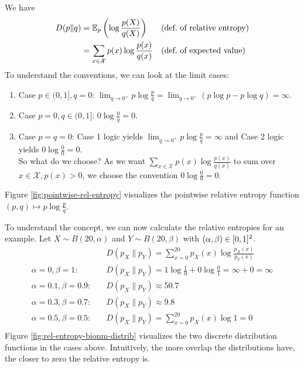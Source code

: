 \begin{remark} \label{remark:relative-entropy-conventions}
    We have
    \begin{align*}
        D(p \| q)   &= \mathbb{E}_{p}\left(\log \frac{p(X)}{q(X)}\right)                      && \text{(def.~of relative entropy)} \\
                    &= \sum_{x \in \mathcal{X}}{p(x) \log \frac{p(x)}{q(x)}}        && \text{(def.~of expected value)}
    \end{align*}
    To understand the conventions, we can look at the limit cases:
    \begin{enumerate}
        \item Case $p \in (0, 1], q = 0$: $\lim_{q \to 0^+} p \log \frac{p}{q} = \lim_{q \to 0^+} (p \log p - p \log q) = \infty$.
        \item Case $p = 0, q \in (0, 1]$: $0 \log \frac{0}{q} = 0$.
        \item Case $p = q = 0$: Case 1 logic yields $\lim_{q \to 0^+} p \log \frac{p}{q} = \infty$ and Case 2 logic yields $0 \log \frac{0}{0} = 0$. \\
            So what do we choose?
            As we want $\sum_{x \in \mathcal{X}}{p(x) \log \frac{p(x)}{q(x)}}$ to sum over $x \in \mathcal{X}, p(x) > 0$, we choose the convention $0 \log \frac{0}{0} = 0$.
    \end{enumerate}
    Figure \ref{fig:pointwise-rel-entropy} visualizes the pointwise relative entropy function $(p, q) \mapsto p \log \frac{p}{q}$.
\end{remark}

\begin{example}
    To understand the concept, we can now calculate the relative entropies for an example.
    Let $X \sim B(20, \alpha)$ and $Y \sim B(20, \beta)$ with $\left(\alpha, \beta\right) \in [0, 1]^2$.
    \begin{align*}
                                 & \quad D(p_X \| p_Y) = \sum_{x = 0}^{20}{p_X(x) \log \frac{p_X(x)}{p_Y(x)}} \\
        \alpha=0, \beta=1:       & \quad D(p_X \| p_Y) = 1 \log \frac{1}{0} + 0 \log \frac{0}{1} = \infty + 0 = \infty \\
        \alpha=0.1, \beta=0.9:   & \quad D(p_X \| p_Y) \approx 50.7 \\
        \alpha=0.3, \beta=0.7:   & \quad D(p_X \| p_Y) \approx 9.8 \\
        \alpha= 0.5, \beta= 0.5: & \quad D(p_X \| p_Y) = \sum_{x = 0}^{20}{p_X(x) \log 1} = 0 \\
    \end{align*}
    Figure \ref{fig:rel-entropy-bionm-distrib} visualizes the two discrete distribution functions in the cases above.
    Intuitively, the more overlap the distributions have, the closer to zero the relative entropy is.
\end{example}


